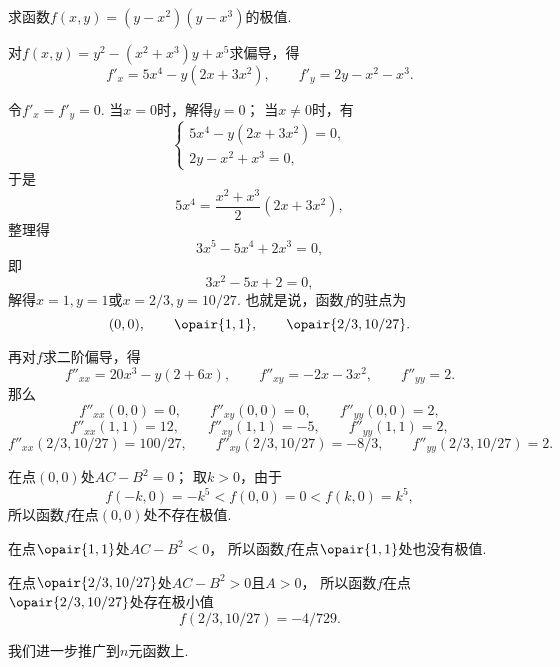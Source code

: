 \begin{example}
求函数\(f(x,y) = (y-x^2)(y-x^3)\)的极值.
\begin{solution}
对\(f(x,y) = y^2 - (x^2+x^3) y + x^5\)求偏导，得\[
f'_x = 5x^4 - y(2x+3x^2),
\qquad
f'_y = 2y - x^2 - x^3.
\]

令\(f'_x = f'_y = 0\).
当\(x=0\)时，解得\(y = 0\)；
当\(x\neq0\)时，有\[
\begin{cases}
5x^4-y(2x+3x^2) = 0, \\
2y-x^2+x^3 = 0,
\end{cases}
\]于是\[
5x^4 = \frac{x^2+x^3}{2}(2x+3x^2),
\]整理得\[
3x^5-5x^4+2x^3=0,
\]即\[
3x^2-5x+2=0,
\]解得\(x=1,y=1\)或\(x=2/3,y=10/27\).
也就是说，函数\(f\)的驻点为\[
(0,0), \qquad
\opair{1,1}, \qquad
\opair{2/3,10/27}.
\]

再对\(f\)求二阶偏导，得\[
f''_{xx} = 20x^3 - y(2+6x),
\qquad
f''_{xy} = -2x-3x^2,
\qquad
f''_{yy} = 2.
\]
那么
\[
f''_{xx}(0,0) = 0,
\qquad
f''_{xy}(0,0) = 0,
\qquad
f''_{yy}(0,0) = 2,
\]\[
f''_{xx}(1,1) = 12,
\qquad
f''_{xy}(1,1) = -5,
\qquad
f''_{yy}(1,1) = 2,
\]\[
f''_{xx}(2/3,10/27) = 100/27,
\qquad
f''_{xy}(2/3,10/27) = -8/3,
\qquad
f''_{yy}(2/3,10/27) = 2.
\]

在点\((0,0)\)处\(AC-B^2 = 0\)；
取\(k>0\)，由于\[
f(-k,0) = -k^5 < f(0,0) = 0 < f(k,0) = k^5,
\]所以函数\(f\)在点\((0,0)\)处不存在极值.

在点\(\opair{1,1}\)处\(AC-B^2 < 0\)，
所以函数\(f\)在点\(\opair{1,1}\)处也没有极值.

在点\(\opair{2/3,10/27}\)处\(AC-B^2 > 0\)且\(A>0\)，
所以函数\(f\)在点\(\opair{2/3,10/27}\)处存在极小值\[
f(2/3,10/27) = -4/729.
\]
\end{solution}
\end{example}

我们进一步推广到\(n\)元函数上.
\begingroup
\def\x{\mat{X}}
\def\X#1{\x_{#1}}
\def\z{\mat{0}}

